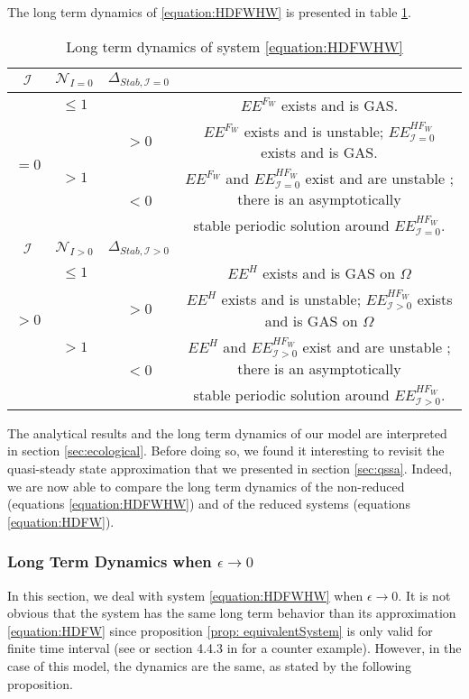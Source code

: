 \documentclass{article}
\newcommand{\cI}{\mathcal{I}}
\newcommand{\vtrois}[1]{\textcolor{OliveGreen}{#1}}
\theoremstyle{definition}
\theoremstyle{remark}
\begin{document}
The long term dynamics of \eqref{equation:HDFWHW} is presented in table \ref{table:long term dynamics, I = 0}.
\vtrois{
\begin{table}[!ht]
\centering
\def\arraystretch{2}
\begin{tabular}{c|c|c|c}
$\cI$  & $\mathcal{N}_{I = 0}$ &  $\Delta_{Stab, \cI = 0}$ & \\
\hline
\multirow{4}{*}{$=0$}& $ \leq 1$ & &$EE^{F_W}$ exists and is GAS.  \\
\cline{2-4}
 &  \multirow{3}{*}{$> 1$} & $ >0$ &$EE^{F_W}$ exists and is unstable; $EE^{HF_W}_{\cI=0}$ exists and is GAS.\\
 \cline{3-4}
 &  &\multirow{2}{*}{$ <0 $} & $EE^{F_W}$ and $EE^{HF_W}_{\cI=0}$ exist and are unstable ; there is an asymptotically \\
&  & &  stable periodic solution around $EE^{HF_W}_{\cI=0}$. \\
\hline
\hline
$\cI$  & $\mathcal{N}_{I > 0}$ &  $\Delta_{Stab, \cI > 0}$ & \\
\hline
\multirow{3}{*}{$>0$} & $\leq1$ & &$EE^{H}$ exists and is GAS on $\Omega$ \\
\cline{2-4}
 & \multirow{3}{*}{$> 1$}  & $>0$ &$EE^{H}$ exists and is unstable; $EE^{HF_W}_{\cI>0}$ exists and is GAS on $\Omega$ \\
 \cline{3-4}
 & & \multirow{2}{*}{$ < 0$} &$EE^{H}$ and $EE^{HF_W}_{\cI>0}$ exist and are unstable ; there is an asymptotically \\
 & & &  stable periodic solution around $EE^{HF_W}_{\cI>0}$.
\end{tabular}
\caption{\centering Long term dynamics of system \eqref{equation:HDFWHW}}
\label{table:long term dynamics, I = 0}
\end{table}
}

\vtrois{
The analytical results and the long term dynamics of our model are interpreted in section \ref{sec:ecological}. Before doing so, we found it interesting to revisit the quasi-steady state approximation that we presented in section \ref{sec:qssa}. Indeed, we are now able to compare the long term dynamics of the non-reduced (equations \eqref{equation:HDFWHW}) and of the reduced systems (equations \eqref{equation:HDFW}).
}


\subsubsection{Long Term Dynamics when $\epsilon \rightarrow 0$}
In this section, we deal with system \eqref{equation:HDFWHW} when $\epsilon \rightarrow 0$. It is not obvious that the system has the same long term behavior than its approximation \eqref{equation:HDFW} since proposition \ref{prop: equivalentSystem} is only valid for finite time interval (see \cite{auger_aggregation_2008} or section 4.4.3 in \cite{banasiak_methods_2014} for a counter example). However, in the case of this model, the dynamics are the same, as stated by the following proposition.
\end{document}
